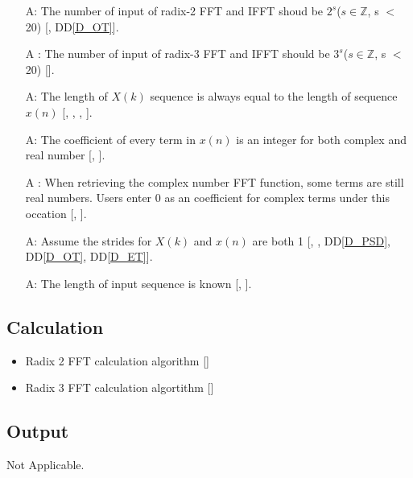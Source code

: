 \documentclass[12pt]{article}
\newcommand{\ddref}[1]{DD\ref{#1}} \newcounter{theorynum} %
\begin{document}
\begin{itemize}

\item[A\refstepcounter{assumpnum}\theassumpnum \label{A_N2}:] The number of
input of radix-2 FFT and IFFT shoud be $2^s$($s\in\mathbb{Z}$, s $<$ 20)
[, \ddref{D_OT}]. \item[A\refstepcounter{assumpnum}\theassumpnum
\label{A_N3}:] The number of input of radix-3 FFT and IFFT should be
$3^s$($s\in\mathbb{Z}$, s $<$ 20) [].
\item[A\refstepcounter{assumpnum}\theassumpnum \label{A_Equal}:] The length of
$X(k)$ sequence is always equal to the length of sequence $x(n)$ [,
, ,  ].
\item[A\refstepcounter{assumpnum}\theassumpnum \label{A_CoI}:] The coefficient
of every term in $x(n)$ is an integer for both complex and real number
[, ]. \item[A\refstepcounter{assumpnum}\theassumpnum
\label{A_C0}:] When retrieving the complex number FFT function, some terms are
still real numbers. Users enter 0 as an coefficient for complex terms under this
occation [, ].
\item[A\refstepcounter{assumpnum}\theassumpnum \label{A_Stride}:] Assume the
strides for ${X}(k)$ and ${x}(n)$ are both 1 [, ,
\ddref{D_PSD}, \ddref{D_OT}, \ddref{D_ET}].
\item[A\refstepcounter{assumpnum}\theassumpnum \label{A_Length}:] The length of
input sequence is known [, ].


\end{itemize}

\subsection{Calculation} \label{sec_Calculation} 
\begin{itemize}

\item Radix 2 FFT calculation algorithm []
\item Radix 3 FFT calculation algortithm []
\end{itemize}

\subsection{Output} \label{sec_Output} Not Applicable.
\end{document}
